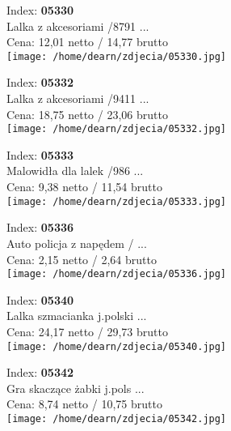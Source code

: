 {Index: \textbf{05330}\\
Lalka z akcesoriami /8791 ...\\
Cena: 12,01 netto / 14,77 brutto\\
  \texttt{[image: /home/dearn/zdjecia/05330.jpg]}}\newline\newline

{Index: \textbf{05332}\\
Lalka z akcesoriami /9411 ...\\
Cena: 18,75 netto / 23,06 brutto\\
  \texttt{[image: /home/dearn/zdjecia/05332.jpg]}}\newline\newline

{Index: \textbf{05333}\\
Malowidła dla lalek  /986 ...\\
Cena: 9,38 netto / 11,54 brutto\\
  \texttt{[image: /home/dearn/zdjecia/05333.jpg]}}\newline\newline

{Index: \textbf{05336}\\
Auto policja z napędem  / ...\\
Cena: 2,15 netto / 2,64 brutto\\
  \texttt{[image: /home/dearn/zdjecia/05336.jpg]}}\newline\newline

{Index: \textbf{05340}\\
Lalka szmacianka j.polski ...\\
Cena: 24,17 netto / 29,73 brutto\\
  \texttt{[image: /home/dearn/zdjecia/05340.jpg]}}\newline\newline

{Index: \textbf{05342}\\
Gra skaczące żabki j.pols ...\\
Cena: 8,74 netto / 10,75 brutto\\
  \texttt{[image: /home/dearn/zdjecia/05342.jpg]}}\newline\newline

